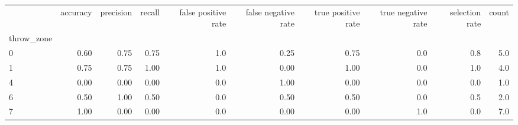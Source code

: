 \begin{tabular}{lrrrrrrrrr}
\toprule
{} &  accuracy &  precision &  recall &  false positive rate &  false negative rate &  true positive rate &  true negative rate &  selection rate &  count \\
throw\_zone &           &            &         &                      &                      &                     &                     &                 &        \\
\midrule
0          &      0.60 &       0.75 &    0.75 &                  1.0 &                 0.25 &                0.75 &                 0.0 &             0.8 &    5.0 \\
1          &      0.75 &       0.75 &    1.00 &                  1.0 &                 0.00 &                1.00 &                 0.0 &             1.0 &    4.0 \\
4          &      0.00 &       0.00 &    0.00 &                  0.0 &                 1.00 &                0.00 &                 0.0 &             0.0 &    1.0 \\
6          &      0.50 &       1.00 &    0.50 &                  0.0 &                 0.50 &                0.50 &                 0.0 &             0.5 &    2.0 \\
7          &      1.00 &       0.00 &    0.00 &                  0.0 &                 0.00 &                0.00 &                 1.0 &             0.0 &    7.0 \\
\bottomrule
\end{tabular}
